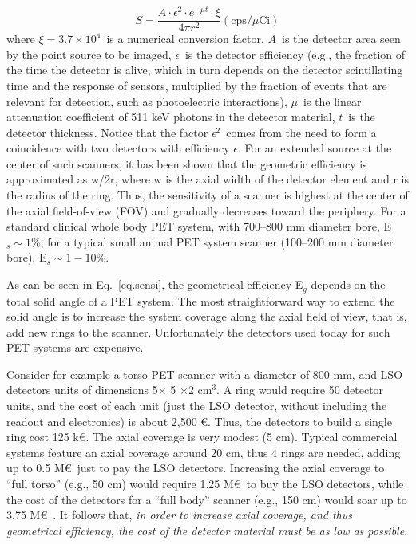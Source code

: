 \documentclass[review]{elsarticle}
\begin{document}
\begin{equation}
S = \frac{A \cdot \epsilon^2 \cdot e^{-\mu t} \cdot \xi}{4 \pi r^2} (\mathrm{cps}/\mu \mathrm{Ci})
\label{eq.sensi}
\end{equation}
%
where $\xi = 3.7 \times 10^4$~is a numerical conversion factor, $A$~is the detector area seen by the point source to be imaged, $\epsilon$~is the detector efficiency (e.g., the fraction of the time the detector is alive, which in turn depends on the detector scintillating time and the response of sensors, multiplied by the fraction of events that are relevant for detection, such as photoelectric interactions), $\mu$~is the linear attenuation coefficient of 511 keV photons in the detector material, $t$~is the detector thickness. Notice that the factor $\epsilon^2$~comes from the need to form a coincidence with two detectors with efficiency $\epsilon$. For an extended source at the center of such scanners, it has been shown that the geometric efficiency is approximated as w/2r, where w is the axial width of the detector element and r is the radius of the ring. Thus, the sensitivity of a scanner is highest at the center of the axial field-of-view (FOV) and gradually decreases toward the periphery.
For a standard clinical whole body PET
system, with 700--800 mm diameter bore, E$_s \sim 1$\%; for a typical
small animal PET system scanner (100--200 mm diameter bore), E$_s \sim 1-10$\%.

As can be seen in Eq.~\ref{eq.sensi}, the geometrical efficiency E$_g$ depends on the total solid angle of a PET system.  The most straightforward way to extend the solid angle is to increase the system
coverage along the axial field of view, that is, add new rings to the scanner. Unfortunately the detectors used today for such PET systems are expensive.

Consider for example a torso PET scanner with a diameter of 800 mm, and LSO detectors units of dimensions 5$\times$ 5 $\times $2 cm$^3$. A ring would require 50 detector units, and the cost of each unit (just the LSO detector, without including the readout and electronics) is about 2,500 \euro. Thus, the detectors to build a single ring cost 125 k\euro. The axial coverage is very modest (5 cm). Typical commercial systems feature an axial coverage around 20 cm, thus 4 rings are needed,  adding up to 0.5 M\euro\ just to pay the LSO detectors. Increasing the axial coverage to ``full torso'' (e.g., 50 cm) would require 1.25 M\euro\ to buy the LSO detectors, while the cost of the detectors for a ``full body'' scanner (e.g., 150 cm) would soar up to 3.75 M\euro\ . It follows that, {\em in order to increase axial coverage, and thus geometrical efficiency, the cost of the detector material must be as low as possible}.
\end{document}
